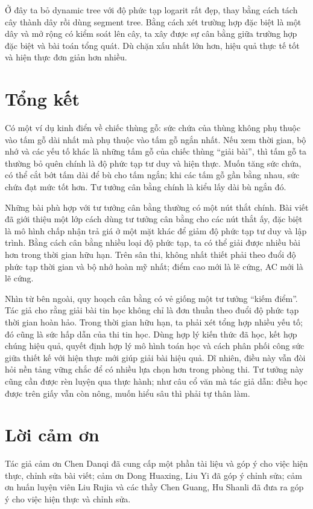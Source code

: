 \documentclass[11pt]{article}
\begin{document}
Ở đây ta bỏ dynamic tree với độ phức tạp logarit rất đẹp, thay bằng cách
tách cây thành dây rồi dùng segment tree. Bằng cách xét trường hợp đặc biệt
là một dây và mở rộng có kiểm soát lên cây, ta xây được sự cân bằng giữa
trường hợp đặc biệt và bài toán tổng quát. Dù chặn xấu nhất lớn hơn, hiệu
quả thực tế tốt và hiện thực đơn giản hơn nhiều.

\section{Tổng kết}

Có một ví dụ kinh điển về chiếc thùng gỗ: sức chứa của thùng không phụ thuộc
vào tấm gỗ dài nhất mà phụ thuộc vào tấm gỗ ngắn nhất. Nếu xem thời gian,
bộ nhớ và các yếu tố khác là những tấm gỗ của chiếc thùng ``giải bài'', thì
tấm gỗ ta thường bỏ quên chính là độ phức tạp tư duy và hiện thực. Muốn tăng
sức chứa, có thể cắt bớt tấm dài để bù cho tấm ngắn; khi các tấm gỗ gần bằng
nhau, sức chứa đạt mức tốt hơn. Tư tưởng cân bằng chính là kiểu lấy dài bù
ngắn đó.

Những bài phù hợp với tư tưởng cân bằng thường có một nút thắt chính. Bài
viết đã giới thiệu một lớp cách dùng tư tưởng cân bằng cho các nút thắt ấy,
đặc biệt là mô hình chấp nhận trả giá ở một mặt khác để giảm độ phức tạp tư
duy và lập trình. Bằng cách cân bằng nhiều loại độ phức tạp, ta có thể giải
được nhiều bài hơn trong thời gian hữu hạn. Trên sân thi, không nhất thiết
phải theo đuổi độ phức tạp thời gian và bộ nhớ hoàn mỹ nhất; điểm cao mới là
lẽ cứng, AC mới là lẽ cứng.

Nhìn từ bên ngoài, quy hoạch cân bằng có vẻ giống một tư tưởng ``kiếm điểm''.
Tác giả cho rằng giải bài tin học không chỉ là đơn thuần theo đuổi độ phức
tạp thời gian hoàn hảo. Trong thời gian hữu hạn, ta phải xét tổng hợp nhiều
yếu tố; đó cũng là sức hấp dẫn của thi tin học. Dùng hợp lý kiến thức đã học,
kết hợp chúng hiệu quả, quyết định hợp lý mô hình toán học và cách phân phối
công sức giữa thiết kế với hiện thực mới giúp giải bài hiệu quả. Dĩ nhiên,
điều này vẫn đòi hỏi nền tảng vững chắc để có nhiều lựa chọn hơn trong phòng
thi. Tư tưởng này cũng cần được rèn luyện qua thực hành; như câu cổ văn mà
tác giả dẫn: điều học được trên giấy vẫn còn nông, muốn hiểu sâu thì phải tự
thân làm.

\section*{Lời cảm ơn}

Tác giả cảm ơn Chen Danqi đã cung cấp một phần tài liệu và góp ý cho việc
hiện thực, chỉnh sửa bài viết; cảm ơn Dong Huaxing, Liu Yi đã góp ý chỉnh
sửa; cảm ơn huấn luyện viên Liu Rujia và các thầy Chen Guang, Hu Shanli đã
đưa ra góp ý cho việc hiện thực và chỉnh sửa.
\end{document}
